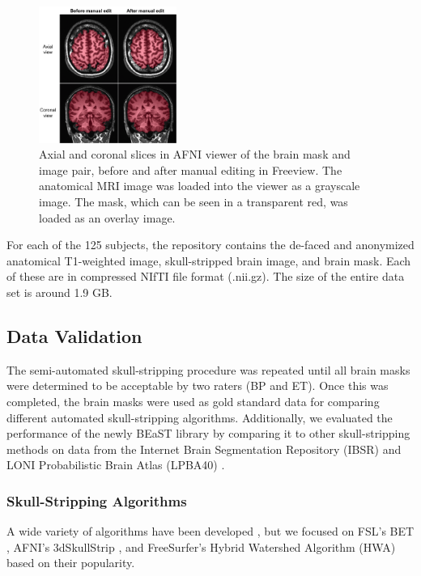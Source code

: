 \begin{figure}[h!]
    \includegraphics[width=0.4\textwidth]{edit.png}
    \caption{
Axial and coronal slices in AFNI viewer of the brain mask and image pair, before and after manual editing in Freeview. The anatomical MRI image was loaded into the viewer as a grayscale image. The mask, which can be seen in a transparent red, was loaded as an overlay image.}
\label{fig:edit}
\end{figure}

For each of the 125 subjects, the repository contains the de-faced and anonymized anatomical T1-weighted image, skull-stripped brain image, and brain mask. Each of these are in compressed NIfTI file format (.nii.gz). The size of the entire data set is around 1.9 GB. \DIFaddbegin {}\DIFaddend 


\subsection*{Data Validation}

The semi-automated skull-stripping procedure was repeated until all brain masks were determined to be acceptable by two raters (BP and ET). Once this was completed, the brain masks were used as gold standard data for comparing different automated skull-stripping algorithms.  Additionally, we evaluated the performance of the newly \DIFdelbegin {}\DIFdelend \DIFaddbegin {}\DIFaddend BEaST library by comparing it to other skull-stripping methods on data from the Internet Brain Segmentation Repository (IBSR) \cite{IBSR} and LONI Probabilistic Brain Atlas (LPBA40) \cite{lpba40}.

\subsubsection*{Skull-Stripping Algorithms}
A wide variety of algorithms have been developed \cite{Iglesias2011, MASS, Brainwash, Sadananthan2010, Lutkenhoff2014, Wang2014, pmid21195780, bse}, but we focused on FSL's BET \cite{Smith2002}, AFNI's 3dSkullStrip \cite{afni}, and FreeSurfer's Hybrid Watershed Algorithm (HWA) \cite{Segonne2004} based on their popularity.

